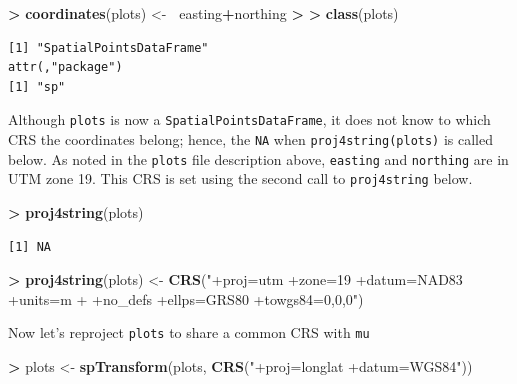 \documentclass[]{krantz}
\makeatletter
\newenvironment{Shaded}{\begin{snugshade}}{\end{snugshade}}
\newcommand{\KeywordTok}[1]{\textcolor[rgb]{0.27,0.27,0.27}{\textbf{#1}}}
\newcommand{\StringTok}[1]{\textcolor[rgb]{0.5,0.5,0.5}{#1}}
\newcommand{\OperatorTok}[1]{\textcolor[rgb]{0.43,0.43,0.43}{\textbf{#1}}}
\newcommand{\ErrorTok}[1]{\textcolor[rgb]{0.14,0.14,0.14}{\textbf{#1}}}
\newcommand{\NormalTok}[1]{#1}
\newenvironment{kframe}{%
\medskip{}
\setlength{\fboxsep}{.8em}
 \def\at@end@of@kframe{}%
 \ifinner\ifhmode%
  \def\at@end@of@kframe{\end{minipage}}%
  \begin{minipage}{\columnwidth}%
 \fi\fi%
 \def\FrameCommand##1{\hskip\@totalleftmargin \hskip-\fboxsep
 \colorbox{shadecolor}{##1}\hskip-\fboxsep
     \hskip-\linewidth \hskip-\@totalleftmargin \hskip\columnwidth}%
 \MakeFramed {\advance\hsize-\width
   \@totalleftmargin\z@ \linewidth\hsize
   \@setminipage}}%
 {\par\unskip\endMakeFramed%
 \at@end@of@kframe}
\renewenvironment{Shaded}{\begin{kframe}}{\end{kframe}}
\theoremstyle{definition}
\theoremstyle{definition}
\theoremstyle{definition}
\theoremstyle{remark}
\makeatother
\begin{document}
\begin{Shaded}
\begin{Highlighting}[]
\OperatorTok{>}\StringTok{ }\KeywordTok{coordinates}\NormalTok{(plots) <-}\StringTok{ }\ErrorTok{~}\NormalTok{easting}\OperatorTok{+}\NormalTok{northing}
\OperatorTok{>}\StringTok{ }
\ErrorTok{>}\StringTok{ }\KeywordTok{class}\NormalTok{(plots)}
\end{Highlighting}
\end{Shaded}

\begin{verbatim}
[1] "SpatialPointsDataFrame"
attr(,"package")
[1] "sp"
\end{verbatim}

Although \texttt{plots} is now a \texttt{SpatialPointsDataFrame}, it
does not know to which CRS the coordinates belong; hence, the
\texttt{NA} when \texttt{proj4string(plots)} is called below. As noted
in the \texttt{plots} file description above, \texttt{easting} and
\texttt{northing} are in UTM zone 19. This CRS is set using the second
call to \texttt{proj4string} below.

\begin{Shaded}
\begin{Highlighting}[]
\OperatorTok{>}\StringTok{ }\KeywordTok{proj4string}\NormalTok{(plots)}
\end{Highlighting}
\end{Shaded}

\begin{verbatim}
[1] NA
\end{verbatim}

\begin{Shaded}
\begin{Highlighting}[]
\OperatorTok{>}\StringTok{ }\KeywordTok{proj4string}\NormalTok{(plots) <-}\StringTok{ }\KeywordTok{CRS}\NormalTok{(}\StringTok{"+proj=utm +zone=19 +datum=NAD83 +units=m }
\StringTok{+                              +no_defs +ellps=GRS80 +towgs84=0,0,0"}\NormalTok{)                   }
\end{Highlighting}
\end{Shaded}

Now let's reproject \texttt{plots} to share a common CRS with
\texttt{mu}

\begin{Shaded}
\begin{Highlighting}[]
\OperatorTok{>}\StringTok{ }\NormalTok{plots <-}\StringTok{ }\KeywordTok{spTransform}\NormalTok{(plots, }\KeywordTok{CRS}\NormalTok{(}\StringTok{"+proj=longlat +datum=WGS84"}\NormalTok{))}
\end{Highlighting}
\end{Shaded}
\end{document}
